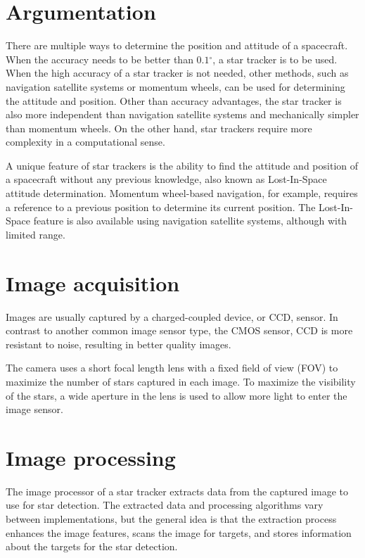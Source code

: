 \documentclass[12pt]{report}
\begin{document}
\section{Argumentation}
There are multiple ways to determine the position and attitude of a spacecraft. When the accuracy needs to be better than $0.1{^\circ}$, a star tracker is to be used. When the high accuracy of a star tracker is not needed, other methods, such as navigation satellite systems or momentum wheels, can be used for determining the attitude and position. Other than accuracy advantages, the star tracker is also more independent than navigation satellite systems and mechanically simpler than momentum wheels. On the other hand, star trackers require more complexity in a computational sense. \citep{SatDesgin}
\par
A unique feature of star trackers is the ability to find the attitude and position of a spacecraft without any previous knowledge, also known as Lost-In-Space attitude determination. Momentum wheel-based navigation, for example, requires a reference to a previous position to determine its current position. The Lost-In-Space feature is also available using navigation satellite systems, although with limited range. \citep{SatDesgin}

\section{Image acquisition}
Images are usually captured by a charged-coupled device, or CCD, sensor. In contrast to another common image sensor type, the CMOS sensor, CCD is more resistant to noise, resulting in better quality images.
\par
The camera uses a short focal length lens with a fixed field of view (FOV) to maximize the number of stars captured in each image. To maximize the visibility of the stars, a wide aperture in the lens is used to allow more light to enter the image sensor.

\section{Image processing}
The image processor of a star tracker extracts data from the captured image to use for star detection. The extracted data and processing algorithms vary between implementations, but the general idea is that the extraction process enhances the image features, scans the image for targets, and stores information about the targets for the star detection.
\end{document}
